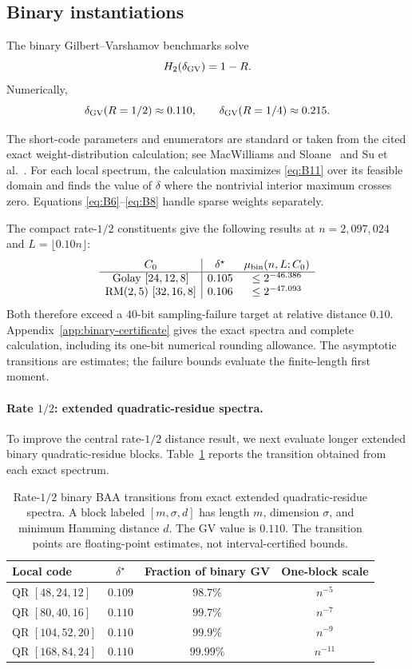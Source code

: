 \documentclass[runningheads,envcountsame,envcountsect]{llncs}
\begin{document}
\subsection{Binary instantiations}

The binary Gilbert--Varshamov benchmarks solve
\[
    H_2(\delta_{\rm GV})=1-R.
\]
Numerically,
\[
    \delta_{\rm GV}(R=1/2)\approx0.110,
    \qquad
    \delta_{\rm GV}(R=1/4)\approx0.215.
\]

The short-code parameters and enumerators are standard or taken from the cited
exact weight-distribution calculation; see MacWilliams and
Sloane~\cite{macwilliams} and Su et al.~\cite{su08}.  For each local spectrum,
the calculation maximizes \eqref{eq:B11} over its feasible domain and finds the value of
$\delta$ where the nontrivial interior maximum crosses zero.  Equations
\eqref{eq:B6}--\eqref{eq:B8} handle sparse weights separately.

The compact rate-$1/2$ constituents give the following results at
$n=2{,}097{,}024$ and $L=\lfloor0.10n\rfloor$:
\[
\begin{array}{c|cc}
C_0 & \delta^\star & \mu_{\rm bin}(n,L;C_0)\\\hline
\text{Golay }[24,12,8] & 0.105 & \le 2^{-46.386}\\
\operatorname{RM}(2,5)\ [32,16,8] & 0.106 & \le 2^{-47.093}
\end{array}
\]
Both therefore exceed a $40$-bit sampling-failure target at relative distance
$0.10$.  Appendix~\ref{app:binary-certificate} gives the exact spectra and
complete calculation, including its one-bit numerical rounding allowance.
The asymptotic transitions are estimates; the failure bounds evaluate the
finite-length first moment.

\paragraph{Rate $1/2$: extended quadratic-residue spectra.}
To improve the central rate-$1/2$ distance result, we next evaluate longer
extended binary quadratic-residue blocks.  Table~\ref{tab:binary-qr} reports the
transition obtained from each exact spectrum.

\begin{table}[ht]
\centering
\small
\begin{tabular}{@{}lccc@{}}
\toprule
Local code & $\delta^\star$ & Fraction of binary GV & One-block scale \\
\midrule
QR $[48,24,12]$   & $0.109$ & $98.7\%$ & $n^{-5}$ \\
QR $[80,40,16]$   & $0.110$ & $99.7\%$ & $n^{-7}$ \\
QR $[104,52,20]$  & $0.110$ & $99.9\%$ & $n^{-9}$ \\
QR $[168,84,24]$  & $0.110$ & $99.99\%$ & $n^{-11}$ \\
\bottomrule
\end{tabular}
\caption{Rate-$1/2$ binary BAA transitions from exact extended
quadratic-residue spectra.  A block labeled $[m,\sigma,d]$ has length $m$,
dimension $\sigma$, and minimum Hamming distance $d$.  The GV value is $0.110$.
The transition points are floating-point estimates, not interval-certified
bounds.}
\label{tab:binary-qr}
\end{table}
\end{document}

